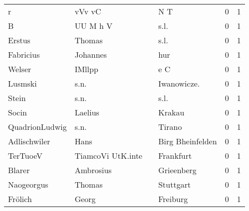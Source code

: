 \begin{center}
\begin{tiny}
\begin{longtabu}{llllrr}
                        r &                             vVv vC &             &                                         N T &          0 &         1 \\
                        B &                           UU M h V &             &                                        s.l. &          0 &         1 \\
                   Erstus &                             Thomas &             &                                        s.l. &          0 &         1 \\
                Fabricius &                           Johannes &             &                                         hur &          0 &         1 \\
                   Welser &                             IMllpp &             &                                         e C &          0 &         1 \\
                  Lusmski &                               s.n. &             &                                Iwanowicze.  &          0 &         1 \\
                    Stein &                               s.n. &             &                                        s.l. &          0 &         1 \\
                    Socin &                            Laelius &             &                                      Krakau &          0 &         1 \\
           QuadrionLudwig &                               s.n. &             &                                      Tirano &          0 &         1 \\
             Adlischwiler &                               Hans &             &                            Birg Bheinfelden &          0 &         1 \\
                 TerTuoeV &                  TiamcoVi UtK.inte &             &                                   Frankfurt &          0 &         1 \\
                   Blarer &                          Ambrosius &             &                                  Grieenberg &          0 &         1 \\
               Naogeorgus &                             Thomas &             &                                   Stuttgart &          0 &         1 \\
                  Frölich &                              Georg &             &                                    Freiburg &          0 &         1 \\

\end{longtabu}
\end{tiny}
\end{center}
